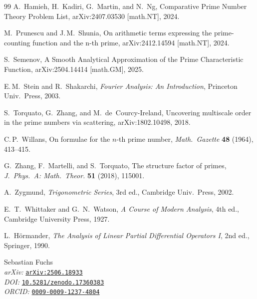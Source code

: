 \documentclass[11pt,a4paper]{amsart}
\theoremstyle{plain}
\theoremstyle{definition}
\theoremstyle{remark}
\begin{document}
\begin{thebibliography}{99}
A.~Hamieh, H.~Kadiri, G.~Martin, and N.~Ng,
Comparative Prime Number Theory Problem List, arXiv:2407.03530 [math.NT], 2024.

M.~Prunescu and J.\,M.~Shunia, On arithmetic terms expressing the prime-counting function and the n-th prime, arXiv:2412.14594 [math.NT], 2024.

S.~Semenov, A Smooth Analytical Approximation of the Prime Characteristic Function, arXiv:2504.14414 [math.GM], 2025.

E.\,M.~Stein and R.~Shakarchi, \emph{Fourier Analysis: An Introduction}, Princeton Univ.\ Press, 2003.

S.~Torquato, G.~Zhang, and M.~de~Courcy-Ireland,
Uncovering multiscale order in the prime numbers via scattering, arXiv:1802.10498, 2018.

C.\,P.~Willans, On formulae for the $n$-th prime number, \emph{Math.\ Gazette} \textbf{48} (1964), 413–415.

G.~Zhang, F.~Martelli, and S.~Torquato,
The structure factor of primes,
\emph{J.\ Phys.\ A: Math.\ Theor.} \textbf{51} (2018), 115001.

A.~Zygmund, \emph{Trigonometric Series}, 3rd ed., Cambridge Univ.\ Press, 2002.

E.~T.~Whittaker and G.~N.~Watson, \emph{A Course of Modern Analysis}, 4th ed., Cambridge University Press, 1927.

L.~H\"ormander, \emph{The Analysis of Linear Partial Differential Operators I}, 2nd ed., Springer, 1990.

\end{thebibliography}



\vfill
\par\noindent
\small
Sebastian Fuchs \\[1ex]
\textit{arXiv:} \texttt{\href{https://arxiv.org/abs/2506.18933}{arXiv:2506.18933}} \\
\textit{DOI:} \texttt{\href{https://doi.org/10.5281/zenodo.17360383}{10.5281/zenodo.17360383}} \\ 
\textit{ORCID:} \texttt{\href{https://orcid.org/0009-0009-1237-4804}{0009-0009-1237-4804}} \\
\end{document}
